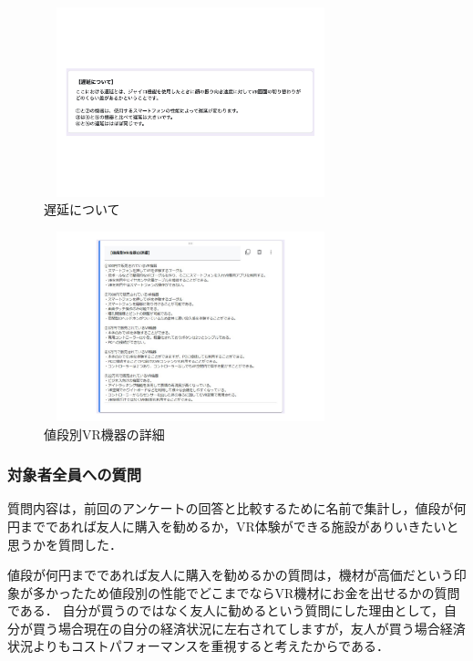 \documentclass[12pt,a4j]{ltjsarticle}
\begin{document}
\begin{figure}[h]
\begin{center}
 \includegraphics[clip,width=85mm,height=55mm]{遅延について.pdf}
\end{center}
 \caption{遅延について}
 \label{fig:遅延について.pdf}
\end{figure}

\begin{figure}[h]
\begin{center}
 \includegraphics[clip,width=85mm,height=55mm]{値段別VR機器の詳細.pdf}
\end{center}
 \caption{値段別VR機器の詳細}
 \label{fig:値段別VR機器の詳細.pdf}
\end{figure}

\subsubsection{対象者全員への質問}
質問内容は，前回のアンケートの回答と比較するために名前で集計し，値段が何円までであれば友人に購入を勧めるか，VR体験ができる施設がありいきたいと思うかを質問した．

値段が何円までであれば友人に購入を勧めるかの質問は，機材が高価だという印象が多かったため値段別の性能でどこまでならVR機材にお金を出せるかの質問である．
自分が買うのではなく友人に勧めるという質問にした理由として，自分が買う場合現在の自分の経済状況に左右されてしますが，友人が買う場合経済状況よりもコストパフォーマンスを重視すると考えたからである．
\end{document}
